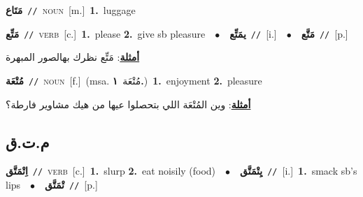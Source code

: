 \documentclass[10pt,a4paper,twoside]{article} %
\begin{document}
\begin{multicols}{2}
{{{{\setlength\topsep{0pt}\textbf{\foreignlanguage{arabic}{مَتَاع}}\ {\color{gray}\texttt{//}\color{black}}\ \textsc{noun}\ [m.]\ \textbf{1.}~luggage\ 

{\setlength\topsep{0pt}\textbf{\foreignlanguage{arabic}{مَتِّع}}\ {\color{gray}\texttt{//}\color{black}}\ \textsc{verb}\ [c.]\ \textbf{1.}~please  \textbf{2.}~give sb pleasure\ \ $\bullet$\ \ \setlength\topsep{0pt}\textbf{\foreignlanguage{arabic}{يمَتِّع}}\ {\color{gray}\texttt{//}\color{black}}\ [i.]\ \ $\bullet$\ \ \setlength\topsep{0pt}\textbf{\foreignlanguage{arabic}{مَتَّع}}\ {\color{gray}\texttt{//}\color{black}}\ [p.]\  \begin{flushright}\color{gray}\foreignlanguage{arabic}{\textbf{\underline{\foreignlanguage{arabic}{أمثلة}}}: مَتِّع نظرك بهالصور المبهرة}\end{flushright}\color{black}} \vspace{2mm}

{\setlength\topsep{0pt}\textbf{\foreignlanguage{arabic}{مُتْعَة}}\ {\color{gray}\texttt{//}\color{black}}\ \textsc{noun}\ [f.]\ \color{gray}(msa. \foreignlanguage{arabic}{مُتْعَة}~\foreignlanguage{arabic}{\textbf{١.}})\color{black}\ \textbf{1.}~enjoyment  \textbf{2.}~pleasure\  \begin{flushright}\color{gray}\foreignlanguage{arabic}{\textbf{\underline{\foreignlanguage{arabic}{أمثلة}}}: وين المُتْعَة اللي بتحصلوا عيها من هيك مشاوير فارطة؟}\end{flushright}\color{black}} \vspace{2mm}

\vspace{-3mm}
\subsection*{\color{blue}\foreignlanguage{arabic}{م.ت.ق}\color{blue}{}} 

{\setlength\topsep{0pt}\textbf{\foreignlanguage{arabic}{اِتْمَتَّق}}\ {\color{gray}\texttt{//}\color{black}}\ \textsc{verb}\ [c.]\ \textbf{1.}~slurp  \textbf{2.}~eat noisily (food)\ \ $\bullet$\ \ \setlength\topsep{0pt}\textbf{\foreignlanguage{arabic}{يِتْمَتَّق}}\ {\color{gray}\texttt{//}\color{black}}\ [i.]\ \textbf{1.}~smack sb's lips\ \ $\bullet$\ \ \setlength\topsep{0pt}\textbf{\foreignlanguage{arabic}{تْمَتَّق}}\ {\color{gray}\texttt{//}\color{black}}\ [p.]\ 

}}}}}
\end{multicols}
\end{document}
